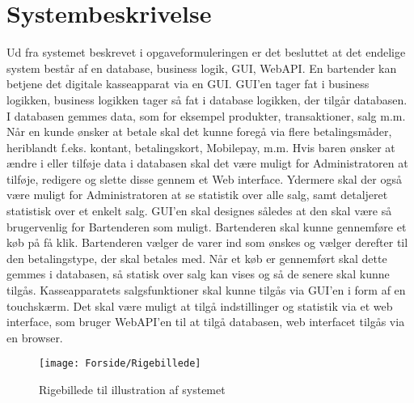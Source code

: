\chapter{Systembeskrivelse}

Ud fra systemet beskrevet i opgaveformuleringen er det besluttet at det endelige system består af en database, business logik, \gls{GUI}, \gls{WebAPI}. 
\newline\newline
En bartender kan betjene det digitale kasseapparat via en \gls{GUI}. \gls{GUI}'en tager fat i business logikken, business logikken tager så fat i database logikken, der tilgår databasen. I databasen gemmes data, som for eksempel produkter, transaktioner, salg m.m.
Når en kunde ønsker at betale skal det kunne foregå via flere betalingsmåder, heriblandt f.eks. kontant, betalingskort, Mobilepay, m.m.
\newline\newline
Hvis baren ønsker at ændre i eller tilføje data i databasen skal det være muligt for Administratoren at tilføje, redigere og slette disse gennem et Web interface. Ydermere skal der også være muligt for Administratoren at se statistik over alle salg, samt detaljeret statistisk over et enkelt salg. 
\newline\newline
GUI'en skal designes således at den skal være så brugervenlig for Bartenderen som muligt. Bartenderen skal kunne gennemføre et køb på få klik. Bartenderen vælger de varer ind som ønskes og vælger derefter til den betalingstype, der skal betales med. Når et køb er gennemført skal dette gemmes i databasen, så statisk over salg kan vises og så de senere skal kunne tilgås. 
\newline\newline
Kasseapparatets salgsfunktioner skal kunne tilgås via \gls{GUI}'en i form af en touchskærm. Det skal være muligt at tilgå indstillinger og statistik via et web interface, som bruger \gls{WebAPI}'en til at tilgå databasen, web interfacet tilgås via en browser. 
                  
\begin{figure}[h]
    \centering
    \texttt{[image: Forside/Rigebillede]}
    \caption{Rigebillede til illustration af systemet}
    \label{fig:rig_billede}
\end{figure}